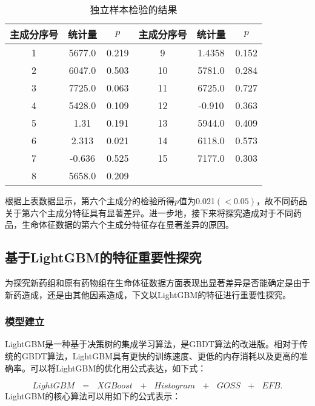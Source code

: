 \begin{table}[H]
    \centering  
    \caption{独立样本检验的结果}
    \begin{tabular}{c c c c c c}  
    	\toprule[1.5pt]  
    	主成分序号 & 统计量 & $p$ & 主成分序号 & 统计量 & $p$\\  
    	\midrule[1pt]    
    	1  & 5677.0 & 0.219 &   9    & 1.4358 & 0.152              \\ 
        2  & 6047.0 & 0.503 &   10   & 5781.0 & 0.284         \\ 
        3  & 7725.0 & 0.063 &   11   & 6725.0 & 0.727          \\ 
        4  & 5428.0 & 0.109 &   12   & -0.910 & 0.363       \\ 
        5  & 1.31   & 0.191 &   13   & 5944.0 & 0.409         \\ 
        6  & 2.313  & 0.021 &   14   & 6118.0 & 0.573        \\ 
        7  & -0.636 & 0.525 &   15   & 7177.0 & 0.303           \\ 
        8  & 5658.0 & 0.209 &        &        &   \\ 

    	\toprule[1.5pt]  
    \end{tabular}  
\end{table} 


根据上表数据显示，第六个主成分的检验所得$p$值为0.021$(<0.05)$，故不同药品关于第六个主成分特征具有显著差异。进一步地，接下来将探究造成对于不同药品，生命体征数据的第六个主成分特征存在显著差异的原因。



\subsection{基于LightGBM的特征重要性探究}

为探究新药组和原有药物组在生命体征数据方面表现出显著差异是否能确定是由于新药造成，还是由其他因素造成，下文以LightGBM的特征进行重要性探究。

\subsubsection{模型建立}

LightGBM是一种基于决策树的集成学习算法，是GBDT算法的改进版。相对于传统的GBDT算法，LightGBM具有更快的训练速度、更低的内存消耗以及更高的准确率。可以将LightGBM的优化用公式表达，如下式：

\begin{equation}
    LightGBM\text{ }=\text{ }XGBoost\text{ }+\text{ }Histogram\text{ }+\text{ }GOSS\text{ }+\text{ }EFB.
\end{equation}
LightGBM的核心算法可以用如下的公式表示：

